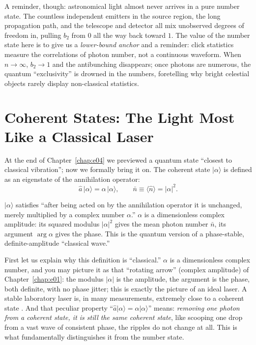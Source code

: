 A reminder, though: astronomical light almost never arrives in a pure number state. The countless independent emitters in the source region, the long propagation path, and the telescope and detector all mix unobserved degrees of freedom in, pulling \(b_2\) from \(0\) all the way back toward \(1\). The value of the number state here is to give us a \emph{lower-bound anchor} and a reminder: click statistics measure the correlations of photon number, not a continuous waveform. When \(n\to\infty\), \(b_2\to 1\) and the antibunching disappears; once photons are numerous, the quantum ``exclusivity'' is drowned in the numbers, foretelling why bright celestial objects rarely display non-classical statistics.

\section{Coherent States: The Light Most Like a Classical Laser}
\label{sec:e06-coherent}

At the end of Chapter~\ref{chap:e04} we previewed a quantum state ``closest to classical vibration''; now we formally bring it on. The coherent state \(|\alpha\rangle\) is defined as an eigenstate of the annihilation operator:
\begin{equation}
  \hat a\,|\alpha\rangle=\alpha\,|\alpha\rangle,
  \qquad
  \bar n\equiv\langle\hat n\rangle=|\alpha|^{2}.
  \label{eq:e06-coherent-def}
\end{equation}
\begin{formulaexplain}
\(|\alpha\rangle\) satisfies ``after being acted on by the annihilation operator it is unchanged, merely multiplied by a complex number \(\alpha\).'' \(\alpha\) is a dimensionless complex amplitude: its squared modulus \(|\alpha|^2\) gives the mean photon number \(\bar n\), its argument \(\arg\alpha\) gives the phase. This is the quantum version of a phase-stable, definite-amplitude ``classical wave.''
\end{formulaexplain}

First let us explain why this definition is ``classical.'' \(\alpha\) is a dimensionless complex number, and you may picture it as that ``rotating arrow'' (complex amplitude) of Chapter~\ref{chap:e01}: the modulus \(|\alpha|\) is the amplitude, the argument is the phase, both definite, with no phase jitter; this is exactly the picture of an ideal laser. A stable laboratory laser is, in many measurements, extremely close to a coherent state \citep{1963PhRv..131.2766G}. And that peculiar property ``\(\hat a|\alpha\rangle=\alpha|\alpha\rangle\)'' means: \emph{removing one photon from a coherent state, it is still the same coherent state}, like scooping one drop from a vast wave of consistent phase, the ripples do not change at all. This is what fundamentally distinguishes it from the number state.

